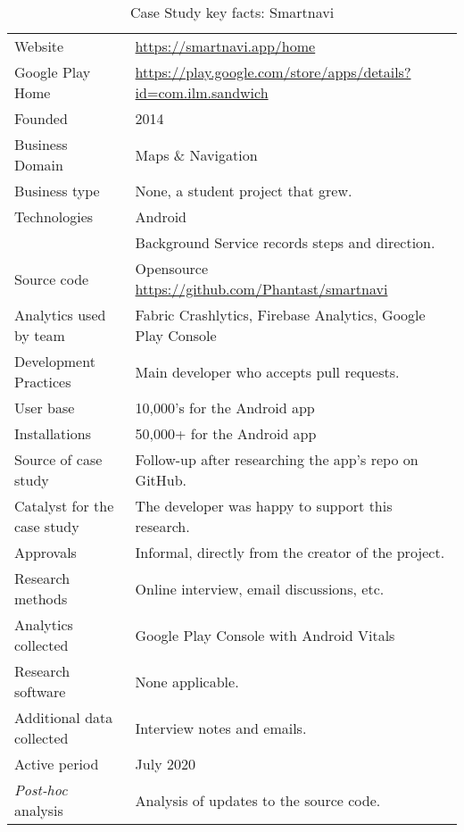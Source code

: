{\renewcommand{\arraystretch}{0.8}%
\begin{table*}
    \centering
    \small
    \setlength{\tabcolsep}{6pt}
    \begin{tabular}{lp{9cm}}
       \toprule
       Website &\url{https://smartnavi.app/home} \\
       Google Play Home & \url{https://play.google.com/store/apps/details?id=com.ilm.sandwich} \\
       Founded & 2014 \\
       Business Domain & Maps \& Navigation \\
       Business type & None, a student project that grew. \\
       Technologies  & Android \\
       & Background Service records steps and direction. \\
       Source code  & Opensource \url{https://github.com/Phantast/smartnavi} \\
       Analytics used by team & Fabric Crashlytics, Firebase Analytics, Google Play Console \\
       Development Practices & Main developer who accepts pull requests. \\
       \midrule
       User base & 10,000's for the Android app \\
       Installations & 50,000+ for the Android app \\
       \midrule
       \midrule
       Source of case study &Follow-up after researching the app's repo on GitHub. \\
       Catalyst for the case study & The developer was happy to support this research. \\
       Approvals &Informal, directly from the creator of the project. \\
       Research methods &Online interview, email discussions, etc. \\
       Analytics collected &Google Play Console with Android Vitals \\
       Research software & None applicable. \\
       Additional data collected &Interview notes and emails. \\
       Active period & July 2020 \\
       \midrule
       \emph{Post-hoc} analysis &Analysis of updates to the source code. \\
       \bottomrule
    \end{tabular}
    \caption{Case Study key facts: Smartnavi}
    \label{tab:smartnavi_anaytics_overview}
\end{table*}
}

